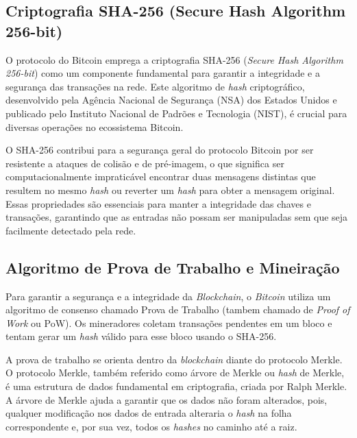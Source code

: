 \documentclass[article,12pt,oneside,a4paper,english,brazil]{unifil}
\begin{document}
\begin{Spacing}{1.5}
\begin{figure}[!hbt]
\end{figure}


\subsection*{Criptografia SHA-256 (Secure Hash Algorithm 256-bit)} \label{subsec:sha256}

O protocolo do Bitcoin emprega a criptografia SHA-256 (\textit{Secure Hash Algorithm 256-bit}) como um componente fundamental para garantir a integridade e a segurança das transações na rede. Este algoritmo de \textit{hash} criptográfico, desenvolvido pela Agência Nacional de Segurança (NSA) dos Estados Unidos e publicado pelo Instituto Nacional de Padrões e Tecnologia (NIST), é crucial para diversas operações no ecossistema Bitcoin.

O SHA-256 contribui para a segurança geral do protocolo Bitcoin por ser resistente a ataques de colisão e de pré-imagem, o que significa ser computacionalmente impraticável encontrar duas mensagens distintas que resultem no mesmo \textit{hash} ou reverter um \textit{hash} para obter a mensagem original. Essas propriedades são essenciais para manter a integridade das chaves e transações, garantindo que as entradas não possam ser manipuladas sem que seja facilmente detectado pela rede.

\subsection*{Algoritmo de Prova de Trabalho e Mineiração} \label{subsec:pow}

Para garantir a segurança e a integridade da \textit{Blockchain}, o \textit{Bitcoin} utiliza um algoritmo de consenso chamado Prova de Trabalho (tambem chamado de \textit{Proof of Work} ou PoW). Os mineradores coletam transações pendentes em um bloco e tentam gerar um \textit{hash} válido para esse bloco usando o SHA-256.

A prova de trabalho se orienta dentro da \textit{blockchain} diante do protocolo Merkle. O protocolo Merkle, também referido como árvore de Merkle ou \textit{hash} de Merkle, é uma estrutura de dados fundamental em criptografia, criada por Ralph Merkle. A árvore de Merkle ajuda a garantir que os dados não foram alterados, pois, qualquer modificação nos dados de entrada alteraria o \textit{hash} na folha correspondente e, por sua vez, todos os \textit{hashes} no caminho até a raiz.


\end{Spacing}
\end{document}
